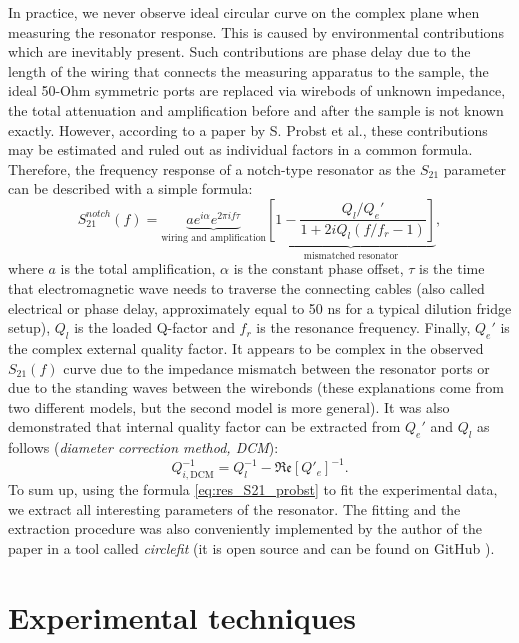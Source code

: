 In practice, we never observe ideal circular curve on the complex plane when measuring the resonator response. This is caused by environmental contributions which are inevitably present. Such contributions are phase delay due to the length of the wiring that connects the measuring apparatus to the sample, the ideal 50-Ohm symmetric ports are replaced via wirebods of unknown impedance, the total attenuation and amplification before and after the sample is not known exactly. However, according to a paper by S. Probst et al\cite{probst2015}., these contributions may be estimated and ruled out as individual factors in a common formula. Therefore, the frequency response of a notch-type resonator as the $S_{21}$ parameter can be described with a simple formula:
\begin{equation}
S_{21}^{notch}(f) = \underbrace{ae^{i\alpha}e^{2\pi if\tau}}_\text{wiring and amplification} \underbrace{\left[1-\frac{Q_l/Q_e'}{1+2iQ_l(f/f_r-1)}\right]}_\text{mismatched resonator},
\label{eq:res_S21_probst}
\end{equation} 
where $a$ is the total amplification, $\alpha$ is the constant phase offset, $\tau$ is the time that electromagnetic wave needs to traverse the connecting cables (also called electrical or phase delay, approximately equal to 50 ns for a typical dilution fridge setup), $Q_l$ is the loaded Q-factor and $f_r$ is the resonance frequency. Finally, $Q_e'$ is the complex external quality factor. It appears to be complex in the observed $S_{21}(f)$ curve due to the impedance mismatch between the resonator ports\cite{Khalil2012} or due to the standing waves between the wirebonds\cite{Deng2013} (these explanations come from two different models, but the second model is more general). It was also demonstrated that internal quality factor can be extracted from $Q_e'$ and $Q_l$ as follows (\textit{diameter correction method, DCM}):
\[
Q_{i, \text{DCM}}^{-1} = Q_l^{-1} - \mathfrak{Re}[Q'_e]^{-1} .
\]
To sum up, using the formula \eqref{eq:res_S21_probst} to fit the experimental data, we extract all interesting parameters of the resonator. The fitting and the extraction procedure was also conveniently implemented by the author of the paper in a tool called \textit{circlefit} (it is open source and can be found on GitHub \href{https://github.com/sebastianprobst/resonator_tools/tree/master/resonator_tools}{\footnotesize{\faExternalLink}}).


\section{Experimental techniques}

